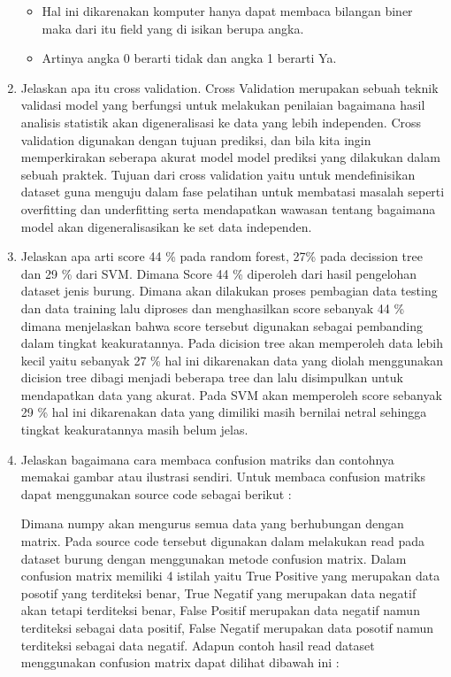 \begin{enumerate}
\begin{itemize}
		\item Hal ini dikarenakan komputer hanya dapat membaca bilangan biner maka dari itu field yang di isikan berupa angka.
		\item Artinya angka 0 berarti tidak dan angka 1 berarti Ya.
	\end{itemize}
	\item Jelaskan apa itu cross validation.
	\hfill\break
	Cross Validation merupakan sebuah teknik validasi model yang berfungsi untuk melakukan penilaian bagaimana hasil analisis statistik akan digeneralisasi ke data yang lebih independen. Cross validation digunakan dengan tujuan prediksi, dan bila kita ingin memperkirakan seberapa akurat model model prediksi yang dilakukan dalam sebuah praktek. Tujuan dari cross validation yaitu untuk mendefinisikan dataset guna menguju dalam fase pelatihan untuk membatasi masalah seperti overfitting dan underfitting serta mendapatkan wawasan tentang bagaimana model akan digeneralisasikan ke set data independen.
	\item Jelaskan apa arti score 44 \% pada random forest, 27\% pada decission tree dan 29 \% dari SVM.
	\hfill\break
	Dimana Score 44 \% diperoleh dari hasil pengelohan dataset jenis burung. Dimana akan dilakukan proses pembagian data testing dan data training lalu diproses dan menghasilkan score sebanyak 44 \% dimana menjelaskan bahwa score tersebut digunakan sebagai pembanding dalam tingkat keakuratannya. Pada dicision tree akan memperoleh data lebih kecil yaitu sebanyak 27 \% hal ini dikarenakan data yang diolah menggunakan dicision tree dibagi menjadi beberapa tree dan lalu disimpulkan untuk mendapatkan data yang akurat. Pada SVM akan memperoleh score sebanyak 29 \% hal ini dikarenakan data yang dimiliki masih bernilai netral sehingga tingkat keakuratannya masih belum jelas.
	\item Jelaskan bagaimana cara membaca confusion matriks dan contohnya memakai gambar atau ilustrasi sendiri.
	\hfill\break
	Untuk membaca confusion matriks dapat menggunakan source code sebagai berikut :
	
	\hfill\break
	Dimana numpy akan mengurus semua data yang berhubungan dengan matrix. Pada source code tersebut digunakan dalam melakukan read pada dataset burung dengan menggunakan metode confusion matrix. Dalam confusion matrix memiliki 4 istilah yaitu True Positive yang merupakan data posotif yang terditeksi benar, True Negatif yang merupakan data negatif akan tetapi terditeksi benar, False Positif merupakan data negatif namun terditeksi sebagai data positif, False Negatif merupakan data posotif namun terditeksi sebagai data negatif. Adapun contoh hasil read dataset menggunakan confusion matrix dapat dilihat dibawah ini :

\end{enumerate}
